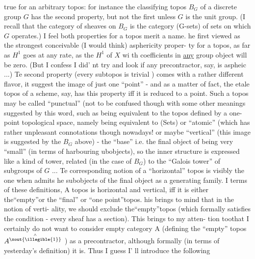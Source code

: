 
true for an arbitrary topos:  for instance the classifying topos $B_G$
of a discrete group $G$ has the second property, but  not the first
 unless $G$ is the unit group. (I recall that the category of
sheaves on $B_G$ is the category  (G-sets)  of sets on which $G$ operates.)
I feel both properties for a topos merit a name.  he first 
viewed as the strongest conceivable (I would think)  asphericity proper-%
ty for a topos,  as far as $H^1$ goes at any rate,  as the $H^1$ of $X$  wi th
coefficients in \uline{any} group object will be zero.  (But I confess I did'%
\margin{$<$}nt try and look if any precontractor,  say,  is aspheic ...) Te
second property (every subtopos is  trivial ) comes with
a  rather different flavor, it suggest the image of just one
``point''  -  and as a matter of fact,  the etale topos of a scheme, say,
has this property iff it is reduced to a point.  Such a topos may be
called ``punctual'' (not to be confused though with some other meanings
suggested by this word,  such as being equivalent to the topos defined
by a one-point topological space,  namely  being equivalent to (Sets)\hand{)}
or ``atomic'' (which has rather unpleasant connotations though nowadays!\hand{),}
or maybe ``vertical'' (this image is suggested by the $B_G$ above) -  the
``base'' i.e. the final object of   being very ``small'' (in terms of
harbouring ubobjects),  so the inner structure is expressed like a
kind of tower,  related (in the case of $B_G$)  to the ``Galois tower''
of subgroups of $G$ ...  Te corresponding notion of a ``horizontal''
topos is visibly the one when   admits he subobjects of the final
object as a generating family.  I terms of these definitions,  A topos
is horizontal and vertical, iff it is either the``empty''or the ``final''
\hand{(}or ``one point''\hand{)}topos. his brings to mind that in the notion of verti-%
ality,  we should exclude the``empty''topos (which formally satisfies
the condition -  every sheaf has a section).  This brings to my atten-%
tion toothat I certainly do not want to consider  empty category
A  (defining  the ``empty'' topos $A^{\overset{\wedge}{\xout{\illegible{1}}}}$ )  as a precontractor,  although
formally (in terms of yesterday's definition) it is.  Thus I guess I'%
ll introduce the following

